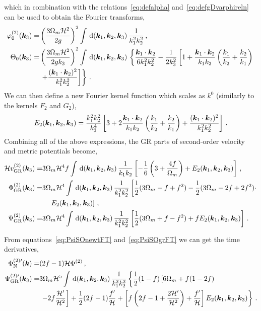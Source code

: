 which in combination with the relations~\eqref{eq:defalpha} and~\eqref{eq:defgDvarphireln} can be used to obtain the Fourier transforms, 
\begin{align}
	\varphi^{(2)}_0 (\bm {k}_3) =& \left( \frac{3 \Omega_m \mathcal{H}^2 }{2 g} \right)^2 \int\,\mathrm{d}(\bm {k}_1,\bm {k}_2,\bm {k}_3)\, \frac{1}{k_1^2 k_2^2}\,,\\
	\Theta_0(\bm {k}_3) =& \left( \frac{3 \Omega_m \mathcal{H}^2}{2 g k_3} \right)^2 \int \,\mathrm{d}(\bm {k}_1,\bm {k}_2,\bm {k}_3)\,\left\{ \frac{\bm {k}_1 \cdot \bm {k}_2}{6 k_1^2 k_2^2} - \frac{1}{2 k_3^2} \left[ 1 + \frac{\bm {k}_1 \cdot \bm {k}_2}{k_1 k_2} \left( \frac{k_1}{k_2} + \frac{k_2}{k_1} \right) \right. \right. \nonumber \\
	&\left. \left. + \frac{(\bm {k}_1 \cdot \bm {k}_2)^2}{k_1^2 k_2^2} \right] \right\}\,.
\end{align}
We can then define a new Fourier kernel function which scales as $k^0$ (similarly to the kernels $F_2$ and $G_2$), 
\begin{equation}
	E_2(\bm {k}_1,\bm {k}_2,\bm {k}_3) = \frac{k_1^2 k_2^2}{k_3^4} \left[ 3 + 2\frac{\bm {k}_1\cdot\bm {k}_2}{k_1 k_2} \left( \frac{k_1}{k_2} + \frac{k_2}{k_1} \right) + \frac{(\bm {k}_1 \cdot \bm {k}_2)^2}{k_1^2 k_2^2} \right]\,.
\end{equation}
Combining all of the above expressions, the GR parts of second-order velocity and metric potentials become, 
\begin{align}
	\mathcal{H} v^{(2)}_{\mathrm{GR}}(\bm {k}_3) =& 3 \Omega_m \mathcal{H}^4 f \int \,\mathrm{d}(\bm {k}_1,\bm {k}_2,\bm {k}_3)\, \frac{1}{k_1 k_2} \left[ - \frac{1}{6} \left( 3 + \frac{4 f}{\Omega_m} \right) + E_2(\bm {k}_1,\bm {k}_2,\bm {k}_3) \right]\,,\\
	\Phi_{\mathrm{GR}}^{(2)}(\bm {k}_3) =& 3 \Omega_m \mathcal{H}^4 \int \,\mathrm{d}(\bm {k}_1,\bm {k}_2,\bm {k}_3)\, \frac{1}{k_1^2 k_2^2} \left[ \frac{1}{2} (3 \Omega_m - f + f^2)  - \frac{1}{2}(3 \Omega_m - 2f + 2 f^2)\cdot\right.\nonumber\\
	&\left. \quad E_2(\bm {k}_1,\bm {k}_2,\bm {k}_3) \right]\,,\\
	\Psi_{\mathrm{GR}}^{(2)}(\bm {k}_3) =& 3 \Omega_m \mathcal{H}^4 \int \,\mathrm{d}(\bm {k}_1,\bm {k}_2,\bm {k}_3)\, \frac{1}{k_1^2 k_2^2} \left[ \frac{1}{2} (3 \Omega_m + f - f^2) + f E_2(\bm {k}_1,\bm {k}_2,\bm {k}_3) \right]\,.\label{eq:PsiSOgrFT}
\end{align}

From equations~\eqref{eq:PsiSOnewtFT} and~\eqref{eq:PsiSOgrFT} we can get the time derivatives, 
\begin{align}
	\Phi_{\mathrm{N}}^{{(2)}\prime}(\bm {k}) =& (2 f - 1) \mathcal{H} \Phi^{(2)}\,,\\
	\Psi_{\mathrm{GR}}^{{(2)}\prime}(\bm {k}_3) =& 3 \Omega_m \mathcal{H}^5 \int \,\mathrm{d}(\bm {k}_1,\bm {k}_2,\bm {k}_3)\, \frac{1}{k_1^2 k_2^2} \left\{ \frac{1}{2}(1-f) \left[ 6 \Omega_m + f(1-2f) \right. \right. \nonumber \\
	&\left. \left. -2f \frac{\mathcal{H}'}{\mathcal{H}^2} \right] + \frac{1}{2}(2f-1) \frac{f'}{\mathcal{H}} + \left[ f \left( 2f - 1 + \frac{2\mathcal{H}'}{\mathcal{H}^2} \right) + \frac{f'}{\mathcal{H}} \right] E_2(\bm {k}_1,\bm {k}_2,\bm {k}_3) \right\}\,.
\end{align}

